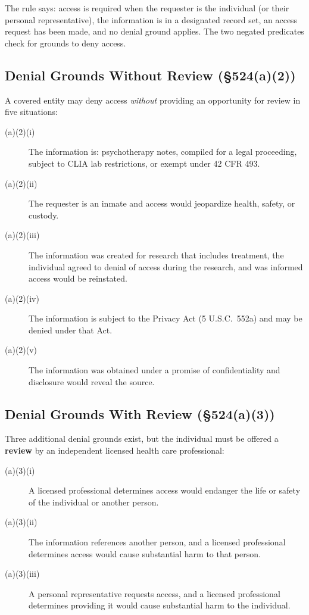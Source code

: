 \documentclass[11pt,letterpaper]{article}
\begin{document}
The rule says: access is required when the requester is the individual (or their personal representative), the information is in a designated record set, an access request has been made, and no denial ground applies. The two negated predicates check for grounds to deny access.

\subsection{Denial Grounds Without Review (\S 524(a)(2))}

A covered entity may deny access \emph{without} providing an opportunity for review in five situations:

\begin{description}
  \item[(a)(2)(i)] The information is: psychotherapy notes, compiled for a legal proceeding, subject to CLIA lab restrictions, or exempt under 42 CFR 493.
  \item[(a)(2)(ii)] The requester is an inmate and access would jeopardize health, safety, or custody.
  \item[(a)(2)(iii)] The information was created for research that includes treatment, the individual agreed to denial of access during the research, and was informed access would be reinstated.
  \item[(a)(2)(iv)] The information is subject to the Privacy Act (5 U.S.C.\ 552a) and may be denied under that Act.
  \item[(a)(2)(v)] The information was obtained under a promise of confidentiality and disclosure would reveal the source.
\end{description}

\subsection{Denial Grounds With Review (\S 524(a)(3))}

Three additional denial grounds exist, but the individual must be offered a \textbf{review} by an independent licensed health care professional:

\begin{description}
  \item[(a)(3)(i)] A licensed professional determines access would endanger the life or safety of the individual or another person.
  \item[(a)(3)(ii)] The information references another person, and a licensed professional determines access would cause substantial harm to that person.
  \item[(a)(3)(iii)] A personal representative requests access, and a licensed professional determines providing it would cause substantial harm to the individual.
\end{description}
\end{document}
